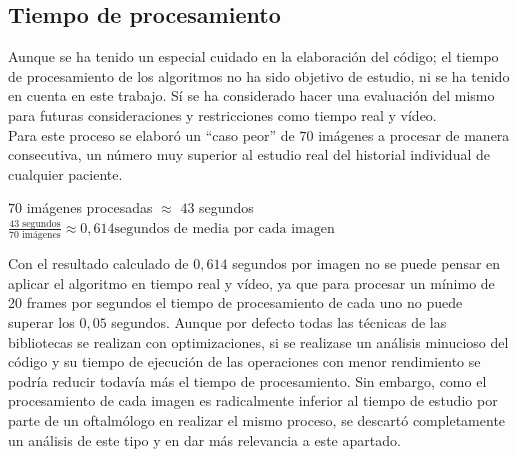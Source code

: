 \subsection{Tiempo de procesamiento}
Aunque se ha tenido un especial cuidado en la elaboración del código;
el tiempo de procesamiento de los algoritmos no ha sido objetivo de
estudio, ni se ha tenido en cuenta en este trabajo. Sí se ha
considerado hacer una evaluación del mismo para futuras
consideraciones y restricciones como tiempo
real y vídeo.\\
Para este proceso se elaboró un ``caso peor'' de $70$ imágenes a
procesar de manera consecutiva, un número muy superior al estudio real
del historial individual de cualquier paciente.\\
\begin{center}
  $70$ imágenes procesadas $\approx$ $43$ segundos
  \\[0.5cm]
  $\frac{43 \text{ segundos}}{70 \text{ imágenes}} \approx 0,614 \text{
    segundos de media por cada imagen}$
\end{center}
Con el resultado calculado de $0,614$ segundos por imagen no se puede
pensar en aplicar el algoritmo en tiempo real y vídeo, ya que para procesar
un mínimo de 20 frames por segundos el tiempo de procesamiento de cada uno
no puede superar los $0,05$ segundos. Aunque por
defecto todas las técnicas de las bibliotecas se realizan con
optimizaciones, si se realizase un análisis minucioso del código y su
tiempo de ejecución de las operaciones con menor rendimiento se podría
reducir todavía más el tiempo de procesamiento. Sin embargo, como el
procesamiento de cada imagen es radicalmente inferior al tiempo de
estudio por parte de un oftalmólogo en realizar el mismo proceso, se
descartó completamente un análisis de este tipo y en dar más
relevancia a este apartado.
